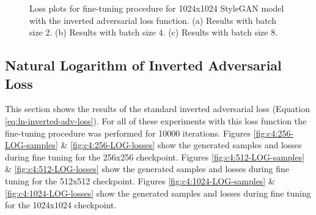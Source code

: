   \begin{figure}[!htbp]
    \centering
    \hfill
    \hfill
    \caption[Loss plots for fine-tuning procedure for 1024x1024 StyleGAN model with the inverted adversarial loss function]{Loss plots for fine-tuning procedure for 1024x1024 StyleGAN model with the inverted adversarial loss function. (a) Results with batch size 2. (b) Results with batch size 4. (c) Results with batch size 8.}
    \label{fig:c4:1024-OG-losses}
  \end{figure}

\FloatBarrier

\subsection{Natural Logarithm of Inverted Adversarial Loss}
\label{c4:sec:log-loss}

This section shows the results of the standard inverted adversarial loss (Equation \ref{eq:ln-inverted-adv-loss}). For all of these experiments with this loss function the fine-tuning procedure was performed for 10000 iterations.
Figures \ref{fig:c4:256-LOG-samples} \& \ref{fig:c4:256-LOG-losses} show the generated samples and losses during fine tuning for the 256x256 checkpoint.
Figures \ref{fig:c4:512-LOG-samples} \& \ref{fig:c4:512-LOG-losses} show the generated samples and losses during fine tuning for the 512x512 checkpoint.
Figures \ref{fig:c4:1024-LOG-samples} \& \ref{fig:c4:1024-LOG-losses} show the generated samples and losses during fine tuning for the 1024x1024 checkpoint.

